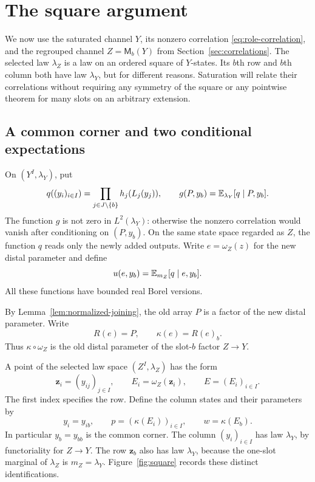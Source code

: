 \section{The square argument}
\label{sec:square}

We now use the saturated channel $Y$, its nonzero correlation
\eqref{eq:role-correlation}, and the regrouped channel
$Z=\mathsf M_b(Y)$ from Section~\ref{sec:correlations}. The selected
law $\lambda_Z$ is a law on an ordered square of $Y$-states. Its
$b$th row and $b$th column both have law $\lambda_Y$, but for different
reasons. Saturation will relate their correlations without requiring
any symmetry of the square or any pointwise theorem for many slots
on an arbitrary extension.

\subsection{A common corner and two conditional expectations}

On $(Y^I,\lambda_Y)$, put
\begin{equation}
 q((y_i)_{i\in I})=
    \prod_{j\in J\setminus\{b\}}h_j(L_j(y_j)),
 \qquad
 g(P,y_b)=\mathbb E_{\lambda_Y}[q\mid P,y_b].
 \label{eq:q-and-g}
\end{equation}
The function $g$ is not zero in $L^2(\lambda_Y)$: otherwise the
nonzero correlation would vanish after conditioning on $(P,y_b)$.
On the same state space regarded as $Z$, the function $q$ reads only
the newly added outputs. Write $e=\omega_Z(z)$ for the new distal
parameter and define
\begin{equation}
 u(e,y_b)=\mathbb E_{m_Z}[q\mid e,y_b].
 \label{eq:u}
\end{equation}
All these functions have bounded real Borel versions.

By Lemma~\ref{lem:normalized-joining}, the old array $P$ is a factor
of the new distal parameter. Write
\[
 R(e)=P,
 \qquad \kappa(e)=R(e)_b.
\]
Thus $\kappa\circ\omega_Z$ is the old distal parameter of the
slot-$b$ factor $Z\to Y$.

A point of the selected law space $(Z^I,\lambda_Z)$ has the form
\[
 \mathbf z_i=(y_{ij})_{j\in I},\qquad
 E_i=\omega_Z(\mathbf z_i),\qquad E=(E_i)_{i\in I}.
\]
The first index specifies the row. Define the column states and their
parameters by
\begin{equation}
 y_i=y_{ib},\qquad
 p=(\kappa(E_i))_{i\in I},\qquad
 w=\kappa(E_b).
 \label{eq:square-parameters}
\end{equation}
In particular $y_b=y_{bb}$ is the common corner. The column
$(y_i)_{i\in I}$ has law $\lambda_Y$, by functoriality for $Z\to Y$.
The row $\mathbf z_b$ also has law $\lambda_Y$, because the one-slot
marginal of $\lambda_Z$ is $m_Z=\lambda_Y$.
Figure~\ref{fig:square} records these distinct identifications.

